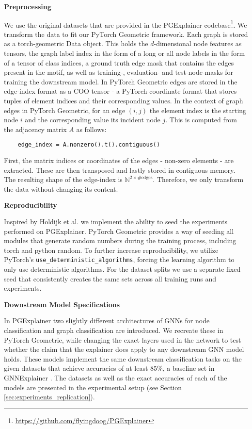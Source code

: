 \textbf{Preprocessing}\par
 We use the original datasets that are provided in the PGExplainer codebase\footnote{\url{https://github.com/flyingdoog/PGExplainer}}. We transform the data to fit our PyTorch Geometric framework. Each graph is stored as a torch-geometric Data object. This holds the $d$-dimensional node features as tensors, the graph label index in the form of a long or all node labels in the form of a tensor of class indices, a ground truth edge mask that contains the edges present in the motif, as well as training-, evaluation- and test-node-masks for training the downstream model. In PyTorch Geometric edges are stored in the edge-index format as a COO tensor - a PyTorch coordinate format that stores tuples of element indices and their corresponding values. In the context of graph edges in PyTorch Geometric, for an edge $(i,j)$ the element index is the starting node $i$ and the corresponding value its incident node $j$. This is computed from the adjacency matrix $A$ as follows:
\begin{verbatim}
    edge_index = A.nonzero().t().contiguous()
\end{verbatim}
First, the matrix indices or coordinates of the edges - non-zero elements - are extracted. These are then transposed and lastly stored in contiguous memory. The resulting shape of the edge-index is $\mathbb{N}^{2\times \text{\#edges}}$. Therefore, we only transform the data without changing its content. \bigskip

\textbf{Reproducibility}\par
 Inspired by Holdijk et al. \cite{holdijk2021re} we implement the ability to seed the experiments performed on PGExplainer. PyTorch Geometric provides a way of seeding all modules that generate random numbers during the training process, including torch and python random.
To further increase reproducibility, we utilize PyTorch's \verb|use_deterministic_algorithms|, forcing the learning algorithm to only use deterministic algorithms. For the dataset splits we use a separate fixed seed that consistently creates the same sets across all training runs and experiments.\bigskip

\textbf{Downstream Model Specifications}\par
 In PGExplainer two slightly different architectures of GNNs for node classification and graph classification are introduced. We recreate these in PyTorch Geometric, while changing the exact layers used in the network to test whether the claim that the explainer does apply to any downstream GNN model holds. These models implement the same downstream classification tasks on the given datasets that achieve accuracies of at least $85\%$, a baseline set in GNNExplainer \cite{ying2019gnnexplainer}. The datasets as well as the exact accuracies of each of the models are presented in the experimental setup (see Section \ref{sec:experiments_replication}). 


